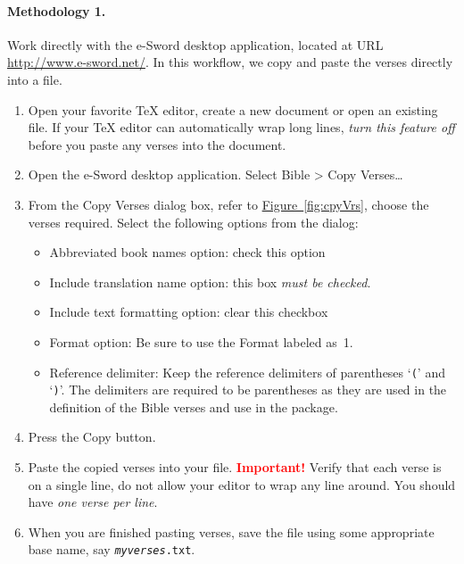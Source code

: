 \documentclass{article}
\begin{document}
    \paragraph*{Methodology 1.} Work directly with the \textsf{e-Sword} desktop
    application, located at URL \url{http://www.e-sword.net/}. In this workflow, we copy and
    paste the verses directly into a  file.
    \begin{enumerate}
        \item Open your favorite {\TeX} editor, create a new document or
            open an existing  file. If your {\TeX} editor can
            automatically wrap long lines, \emph{turn this feature off}
            before you paste any verses into the document.
        \item Open the \textsf{e-Sword} desktop application. Select \textsf{Bible
            > Copy Verses\ldots}
        \item From the \textsf{Copy Verses} dialog box, refer to
            \hyperref[fig:cpyVrs]{Figure~\ref*{fig:cpyVrs}}, choose the
            verses required. Select the following options from the dialog:
            \begin{itemize}
               \item \textsf{Abbreviated book names} option: check this option
               \item \textsf{Include translation name} option: this box \emph{must be checked}.
               \item \textsf{Include text formatting} option: clear this checkbox
               \item \textsf{Format} option: Be sure to use the \textsf{Format} labeled as~1.
               \item \textsf{Reference delimiter}: Keep the reference delimiters of
                   parentheses `\texttt{(}' and `\texttt{)}'. The delimiters are required to
                   be parentheses as they are used in the definition of the Bible
                   verses and use in the  package.
            \end{itemize}
        \item Press the \textsf{Copy} button.
        \item Paste the copied verses into your  file. \textbf{\textcolor{red}{Important!}}
            Verify that each verse is on a single line, do not allow your editor to wrap any line around.
            You should have \emph{one verse per line}.
        \item When you are finished pasting verses, save the  file
            using some appropriate base name, say
            \texttt{{\slshape{myverses}}.txt}.
    \end{enumerate}
\end{document}
